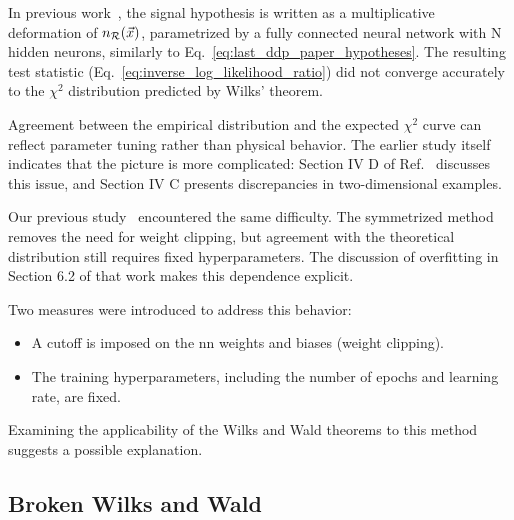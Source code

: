 \documentclass[paper/ddppaper2.tex]{subfiles}
\begin{document}
\iftoggle{ispaper}{
    \section{Convergence of Training}
}{
    \subsection{Convergence of Training}
}
\label{sec:broken_Wilks_Wald}

In previous work~\cite{Italian_no_1_Learning_New_Physics_from_a_Machine, Italian_no_2_Learning_New_Physics_from_an_Imperfect_Machine}, the signal hypothesis is written as a multiplicative deformation of $n_{\mathcal{R}}({\vec{{x}}})$, parametrized by a fully connected neural network with N hidden neurons, similarly to Eq.~\ref{eq:last_ddp_paper_hypotheses}. The resulting test statistic (Eq.~\ref{eq:inverse_log_likelihood_ratio}) did not converge accurately to the $\chi^2$ distribution predicted by Wilks' theorem.

Agreement between the empirical distribution and the expected $\chi^2$ curve can reflect parameter tuning rather than physical behavior. The earlier study itself indicates that the picture is more complicated: Section IV D of Ref.~\cite{Italian_no_1_Learning_New_Physics_from_a_Machine} discusses this issue, and Section IV C presents discrepancies in two-dimensional examples.

Our previous study~\cite{LastDDPPaper} encountered the same difficulty. The symmetrized method removes the need for weight clipping, but agreement with the theoretical distribution still requires fixed hyperparameters. The discussion of overfitting in Section 6.2 of that work makes this dependence explicit.

Two measures were introduced to address this behavior:
\begin{itemize}
    \item A cutoff is imposed on the \gls{nn} weights and biases (weight clipping).
    \item The training hyperparameters, including the number of epochs and learning rate, are fixed.
\end{itemize}

Examining the applicability of the Wilks and Wald theorems to this method suggests a possible explanation.

\subsection{Broken Wilks and Wald}
\end{document}
